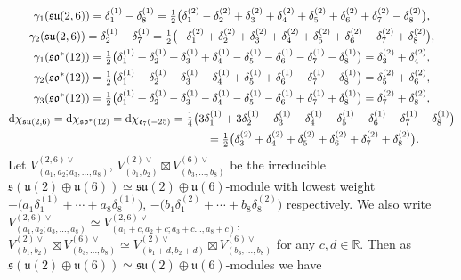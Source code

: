 \documentclass[pdftex]{sigma}
\numberwithin{equation}{section}
\newcommand{\BR}{\mathbb{R}}
\begin{document}
\begin{gather*}
\gamma_1(\mathfrak{su}(2,6))=\delta_1^{(1)}-\delta_8^{(1)}
=\tfrac{1}{2}\big(\delta_1^{(2)}-\delta_2^{(2)}+\delta_3^{(2)}+\delta_4^{(2)}+\delta_5^{(2)}+\delta_6^{(2)}+\delta_7^{(2)}-\delta_8^{(2)}\big),\\
\gamma_2(\mathfrak{su}(2,6))=\delta_2^{(1)}-\delta_7^{(1)}
=\tfrac{1}{2}\big({-}\delta_1^{(2)}+\delta_2^{(2)}+\delta_3^{(2)}+\delta_4^{(2)}+\delta_5^{(2)}+\delta_6^{(2)}-\delta_7^{(2)}+\delta_8^{(2)}\big),\\
\gamma_1(\mathfrak{so}^*(12))
=\tfrac{1}{2}\big(\delta_1^{(1)}+\delta_2^{(1)}+\delta_3^{(1)}+\delta_4^{(1)}-\delta_5^{(1)}-\delta_6^{(1)}-\delta_7^{(1)}-\delta_8^{(1)}\big)
=\delta_3^{(2)}+\delta_4^{(2)},\\
\gamma_2(\mathfrak{so}^*(12))
=\tfrac{1}{2}\big(\delta_1^{(1)}+\delta_2^{(1)}-\delta_3^{(1)}-\delta_4^{(1)}+\delta_5^{(1)}+\delta_6^{(1)}-\delta_7^{(1)}-\delta_8^{(1)}\big)
=\delta_5^{(2)}+\delta_6^{(2)},\\
\gamma_3(\mathfrak{so}^*(12))
=\tfrac{1}{2}\big(\delta_1^{(1)}+\delta_2^{(1)}-\delta_3^{(1)}-\delta_4^{(1)}-\delta_5^{(1)}-\delta_6^{(1)}+\delta_7^{(1)}+\delta_8^{(1)}\big)
=\delta_7^{(2)}+\delta_8^{(2)},\\
{\rm d}\chi_{\mathfrak{su}(2,6)}={\rm d}\chi_{\mathfrak{so}^*(12)}={\rm d}\chi_{\mathfrak{e}_7(-25)}
=\tfrac{1}{4}\big(3\delta_1^{(1)}+3\delta_2^{(1)}-\delta_3^{(1)}-\delta_4^{(1)}-\delta_5^{(1)}-\delta_6^{(1)}-\delta_7^{(1)}-\delta_8^{(1)}\big)\\
\hphantom{{\rm d}\chi_{\mathfrak{su}(2,6)}={\rm d}\chi_{\mathfrak{so}^*(12)}={\rm d}\chi_{\mathfrak{e}_7(-25)}}{} =\tfrac{1}{2}\big(\delta_3^{(2)}+\delta_4^{(2)}+\delta_5^{(2)}+\delta_6^{(2)}+\delta_7^{(2)}+\delta_8^{(2)}\big).
\end{gather*}
Let $V_{(a_1,a_2;a_3,\ldots,a_8)}^{(2,6)\vee}$, $V_{(b_1,b_2)}^{(2)\vee}\boxtimes V_{(b_3,\ldots,b_8)}^{(6)\vee}$ be the irreducible
$\mathfrak{s}(\mathfrak{u}(2)\oplus\mathfrak{u}(6))\simeq\mathfrak{su}(2)\oplus\mathfrak{u}(6)$-module with lowest weight
$-\big(a_1\delta_1^{(1)}+\cdots+a_8\delta_8^{(1)}\big)$, $-\big(b_1\delta_1^{(2)}+\cdots+b_8\delta_8^{(2)}\big)$ respectively.
We also write $V_{(a_1,a_2;a_3,\ldots,a_8)}^{(2,6)\vee}\simeq V_{(a_1+c,a_2+c;a_3+c\ldots,a_8+c)}^{(2,6)\vee}$,
$V_{(b_1,b_2)}^{(2)\vee}\boxtimes V_{(b_3,\ldots,b_8)}^{(6)\vee}\simeq V_{(b_1+d,b_2+d)}^{(2)\vee}\boxtimes V_{(b_3,\ldots,b_8)}^{(6)\vee}$
for any $c,d\in\BR$. Then as $\mathfrak{s}(\mathfrak{u}(2)\oplus\mathfrak{u}(6))\simeq\mathfrak{su}(2)\oplus\mathfrak{u}(6)$-modules we have
\end{document}
